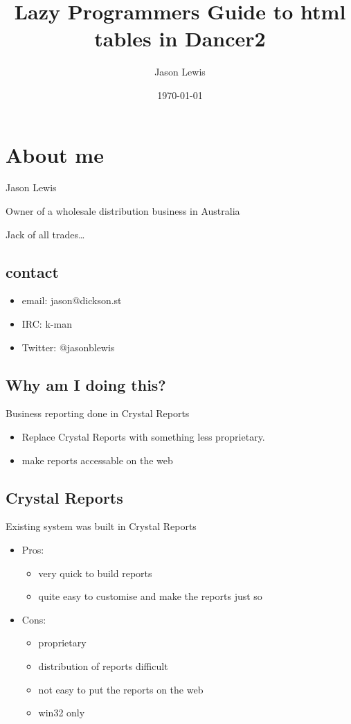 \documentclass[11pt]{article}
\author{Jason Lewis}
\date{\today}
\title{Lazy Programmers Guide to html tables in Dancer2}
\begin{document}
\maketitle
\setcounter{tocdepth}{1}
\tableofcontents


\section*{About me}
\label{sec:orgheadline5}

Jason Lewis

Owner of a wholesale distribution business in Australia

Jack of all trades…
\subsection*{contact}
\label{sec:orgheadline1}
\begin{itemize}
\item email: jason@dickson.st
\item IRC: k-man
\item Twitter: @jasonblewis
\end{itemize}


\subsection*{Why am I doing this?}
\label{sec:orgheadline2}

Business reporting done in Crystal Reports

\begin{itemize}
\item Replace Crystal Reports with something less proprietary.
\item make reports accessable on the web
\end{itemize}

\subsection*{Crystal Reports}
\label{sec:orgheadline3}
Existing system was built in Crystal Reports
\begin{itemize}
\item Pros: 
\begin{itemize}
\item very quick to build reports
\item quite easy to customise and make the reports just so
\end{itemize}
\item Cons: 
\begin{itemize}
\item proprietary
\item distribution of reports difficult
\item not easy to put the reports on the web
\item win32 only
\end{itemize}
\end{itemize}
\end{document}
